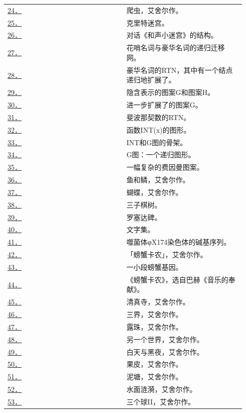 \documentclass[
  12pt,
  twoside,
  openright,
  oldfontcommands,
]{memoir}
\begin{document}
\begin{longtable}[]{>{\raggedright\arraybackslash}p{0.47\linewidth} >{\raggedright\arraybackslash}p{0.47\linewidth}}
\hyperref[fig:24]{24．} & 爬虫，艾舍尔作。 \\
\hyperref[fig:25]{25．} & 克里特迷宫。 \\
\hyperref[fig:26]{26．} & 对话《和声小迷宫》的结构。 \\
\hyperref[fig:27]{27．} & 花哨名词与豪华名词的递归迁移网。 \\
\hyperref[fig:28]{28．} & 豪华名词的RTN，其中有一个结点递归地扩展了。 \\
\hyperref[fig:29]{29．} & 隐含表示的图案G和图案H。 \\
\hyperref[fig:30]{30．} & 进一步扩展了的图案G。 \\
\hyperref[fig:31]{31．} & 斐波那契数的RTN。 \\
\hyperref[fig:32]{32．} & 函数INT(x)的图形。 \\
\hyperref[fig:33]{33．} & INT和G图的骨架。 \\
\hyperref[fig:34]{34．} & G图：一个递归图形。 \\
\hyperref[fig:35]{35．} & 一幅复杂的费因曼图案。 \\
\hyperref[fig:36]{36．} & 鱼和鳞，艾舍尔作。 \\
\hyperref[fig:37]{37．} & 蝴蝶，艾舍尔作。 \\
\hyperref[fig:38]{38．} & 三子棋树。 \\
\hyperref[fig:39]{39．} & 罗塞达碑。 \\
\hyperref[fig:40]{40．} & 文字集。 \\
\hyperref[fig:41]{41．} & 噬菌体φX174染色体的碱基序列。 \\
\hyperref[fig:42]{42．} & 「螃蟹卡农」，艾舍尔作。 \\
\hyperref[fig:43]{43．} & 一小段螃蟹基因。 \\
\hyperref[fig:44]{44．} & 《螃蟹卡农》，选自巴赫《音乐的奉献》。 \\
\hyperref[fig:45]{45．} & 清真寺，艾舍尔作。 \\
\hyperref[fig:46]{46．} & 三界，艾舍尔作。 \\
\hyperref[fig:47]{47．} & 露珠，艾舍尔作。 \\
\hyperref[fig:48]{48．} & 另一个世界，艾舍尔作。 \\
\hyperref[fig:49]{49．} & 白天与黑夜，艾舍尔作。 \\
\hyperref[fig:50]{50．} & 果皮，艾舍尔作。 \\
\hyperref[fig:51]{51．} & 泥塘，艾舍尔作。 \\
\hyperref[fig:52]{52．} & 水面涟漪，艾舍尔作。 \\
\hyperref[fig:53]{53．} & 三个球II，艾舍尔作。 \\
\end{longtable}
\end{document}
